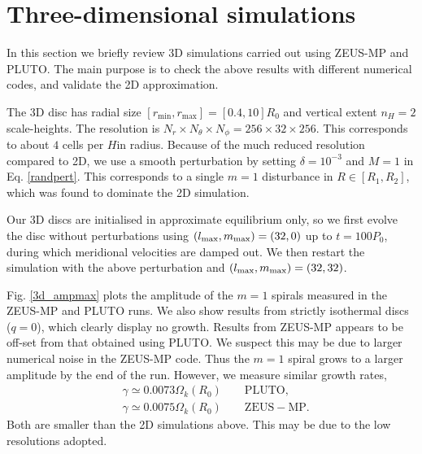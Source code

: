 \section{Three-dimensional simulations}
In this section we briefly review 3D simulations carried 
out using ZEUS-MP and PLUTO. The main purpose is to check 
the above results with different numerical codes, and validate  
the 2D approximation.    

The 3D disc has radial size
$[r_\mathrm{min},r_\mathrm{max}]=[0.4,10]R_0$ and vertical extent 
$n_H=2$ scale-heights. The resolution is $N_r\times N_\theta\times
N_\phi=256\times32\times256$. This corresponds to about $4$ cells per
$H$in radius. 
Because of the much reduced resolution 
compared to 2D, we use a smooth perturbation by setting
$\delta = 10^{-3}$ and $M=1$ in Eq. \ref{randpert}. This corresponds
to a single $m=1$ disturbance in $R\in[R_1,R_2]$, which was found to dominate
the 2D simulation.  

Our 3D discs are initialised in approximate equilibrium only, so we
first evolve the disc without perturbations using  
$(l_\mathrm{max},m_\mathrm{max})=(32,0)$ up to $t=100P_0$, during which 
meridional velocities are damped out. We then restart the simulation
with the above perturbation and $(l_\mathrm{max},m_\mathrm{max})=(32,32)$. 


Fig. \ref{3d_ampmax} plots the amplitude of the $m=1$ spirals measured
in the ZEUS-MP and PLUTO runs. We also show results from strictly
isothermal discs ($q=0$), which clearly display no growth. %
Results from ZEUS-MP appears to be off-set from that obtained using
PLUTO. We suspect this may be due to larger numerical noise in the
ZEUS-MP code. Thus the $m=1$ spiral grows to a larger amplitude by the
end of the run. However, we measure similar growth rates,
\begin{align*}
&\gamma \simeq 0.0073\Omega_k(R_0) \quad\quad \mathrm{PLUTO},\\
&\gamma \simeq 0.0075\Omega_k(R_0) \quad\quad \mathrm{ZEUS-MP}.
\end{align*}
Both are smaller than the 2D simulations above. This may be due to the
low resolutions adopted. 


